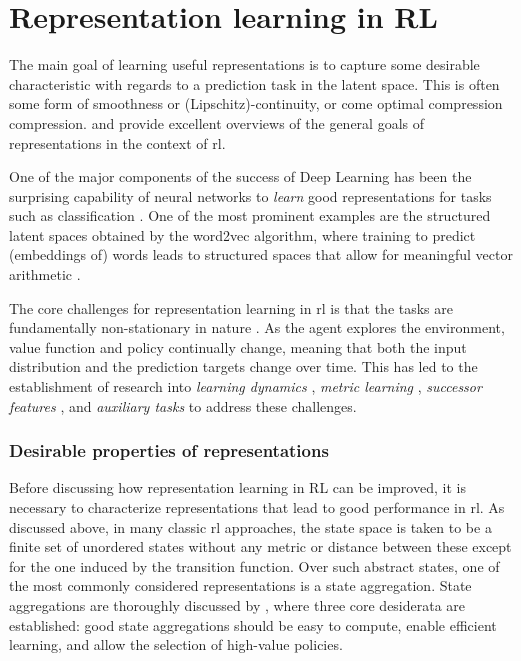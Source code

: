 \section{Representation learning in RL}

The main goal of learning useful representations is to capture some desirable characteristic with regards to a prediction task in the latent space.
This is often some form of smoothness or (Lipschitz)-continuity, or come optimal compression compression.
\textcite{abel2020thesis} and \textcite{le2021metrics} provide excellent overviews of the general goals of representations in the context of \ac{rl}.

One of the major components of the success of Deep Learning has been the surprising capability of neural networks to \emph{learn} good representations for tasks such as classification \parencite{bengio2012representation}.
One of the most prominent examples are the structured latent spaces obtained by the word2vec algorithm, where training to predict (embeddings of) words leads to structured spaces that allow for meaningful vector arithmetic \parencite{mikolov2013distributed,goldberg2014word2vec}.

The core challenges for representation learning in \ac{rl} is that the tasks are fundamentally non-stationary in nature \parencite{kumar2021implicit,nikishin2022primacy}.
As the agent explores the environment, value function and policy continually change, meaning that both the input distribution and the prediction targets change over time.
This has led to the establishment of research into \emph{learning dynamics} \parencite{lyle2022learning,lyle2022understanding}, \emph{metric learning} \parencite{ferns2011bisimulation,zhang2021learning,le2021metrics,kemertas2022approximate}, \emph{successor features} \parencite{barreto2017successor,borsa2018universal}, and \emph{auxiliary tasks} \parencite{jaderberg2017reinforcement,bellemare2019geometric,lyle2021effect,farebrother2023protovalue} to address these challenges.

\subsubsection{Desirable properties of representations}

Before discussing how representation learning in RL can be improved, it is necessary to characterize representations that lead to good performance in \ac{rl}.
As discussed above, in many classic \ac{rl} approaches, the state space is taken to be a finite set of unordered states without any metric or distance between these except for the one induced by the transition function.
Over such abstract states, one of the most commonly considered representations is a state aggregation.
State aggregations are thoroughly discussed by \textcite{abel2020thesis}, where three core desiderata are established: good state aggregations should be easy to compute, enable efficient learning, and allow the selection of high-value policies.

